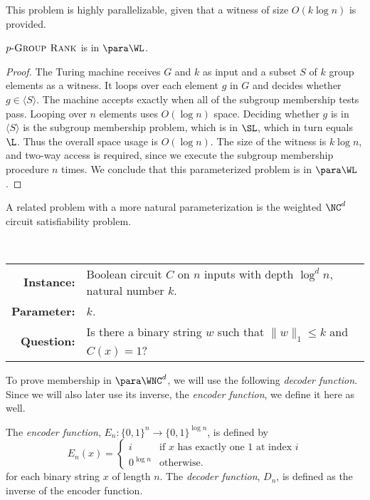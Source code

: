 \documentclass{article}
\newcommand{\dash}{\textnormal{-}}
\newcommand{\pgrouprank}{p\dash\textsc{Group Rank}}
\newcommand{\pNCSAT}{p \dash k \dash \NC^d \textsc{CSat}}
\newcommand{\gen}[1]{\langle#1\rangle}
\begin{document}
This problem is highly parallelizable, given that a witness of size $O(k \log n)$ is provided.

\begin{theorem}\label{thm:pgrouprank}
  $\pgrouprank$ is in $\para \WL$.
\end{theorem}
\begin{proof}
  The Turing machine receives $G$ and $k$ as input and a subset $S$ of $k$ group elements as a witness.
  It loops over each element $g$ in $G$ and decides whether $g \in \gen{S}$.
  The machine accepts exactly when all of the subgroup membership tests pass.
  Looping over $n$ elements uses $O(\log n)$ space.
  Deciding whether $g$ is in $\gen{S}$ is the subgroup membership problem, which is in $\SL$, which in turn equals $\L$.
  Thus the overall space usage is $O(\log n)$.
  The size of the witness is $k \log n$, and two-way access is required, since we execute the subgroup membership procedure $n$ times.
  We conclude that this parameterized problem is in $\para \WL$.
\end{proof}

A related problem with a more natural parameterization is the weighted $\NC^d$ circuit satisfiability problem.

\begin{definition}[$\pNCSAT$]
  \mbox{} \\
  \begin{tabular}{r p{9.2cm}}
    \textbf{Instance:} & Boolean circuit $C$ on $n$ inputs with depth $\log^d n$, natural number $k$. \\
    \textbf{Parameter:} & $k$. \\
    \textbf{Question:} & Is there a binary string $w$ such that $\|w\|_1 \leq k$ and $C(x) = 1$?
  \end{tabular}
\end{definition}

To prove membership in $\para \WNC^d$, we will use the following \emph{decoder function}.
Since we will also later use its inverse, the \emph{encoder function}, we define it here as well.

\begin{definition}\label{def:coding}
  The \emph{encoder function}, $E_n \colon \{0, 1\}^n \to \{0, 1\}^{\log n}$, is defined by
  \[
  E_n(x) =
  \begin{cases}
    i & \text{if } x \text{ has exactly one 1 at index } i \\
    0^{\log n} & \text{otherwise}.
  \end{cases}
  \]
  for each binary string $x$ of length $n$.
  The \emph{decoder function}, $D_n$, is defined as the inverse of the encoder function.
\end{definition}
\end{document}
